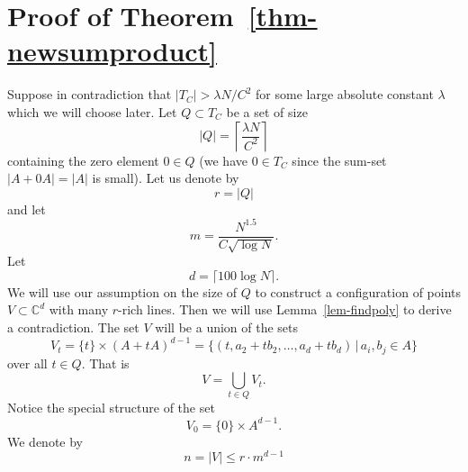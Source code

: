 \documentclass[11pt]{article}
\def\C{{\mathbb{C}}}
\begin{document}
\section{Proof of Theorem~\ref{thm-newsumproduct}}\label{sec-newsumproduct}


Suppose in contradiction that $|T_C| > \lambda N/C^2$ for some large absolute constant $\lambda$ which we will choose later. Let $Q \subset T_C$ be a set of size  $$ |Q| = \left\lceil \frac{\lambda N}{C^2} \right\rceil$$ 
containing the zero element $0 \in Q$ (we have $0 \in T_C$ since the sum-set  $|A+0A| = |A|$ is small). Let us denote by $$r = |Q|$$ and let $$ m = \frac{N^{1.5}}{C\sqrt{\log N}}.$$
Let   $$	d = \lceil 100\log N \rceil.$$ We will  use our assumption on the size of $Q$ to construct a configuration of points $V \subset \C^d$ with many $r$-rich lines. Then we will use Lemma~\ref{lem-findpoly} to derive a contradiction. The set $V$ will be a union of the sets
$$	V_t = \{t\} \times (A+ tA)^{d-1} 	   = \{ (t,a_2 + t b_2, \ldots, a_d + tb_d) \,|\, a_i,b_j \in A \}$$ over all $t \in Q$. That is $$ V = \bigcup_{t \in Q} V_t.$$ Notice the special structure of the set 
$$ V_0 = \{0\} \times A^{d-1}. $$ We denote by 
\begin{equation}\label{eq-Vsize}
	 n = |V| \leq r \cdot m^{d-1}
\end{equation}
\end{document}
